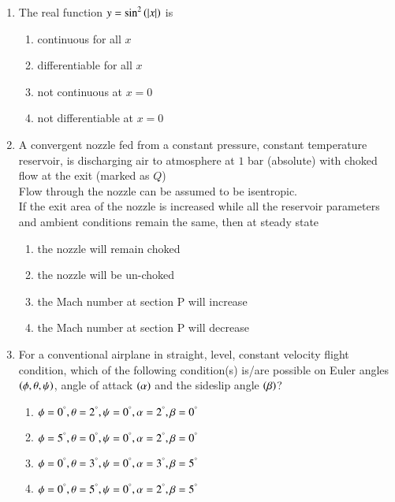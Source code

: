 \documentclass[journal]{IEEEtran}
\begin{document}
\begin{enumerate}
    \item The real function $y = \sin ^2 \left(\left\vert x\right\vert\right)$ is
        \begin{enumerate}
            \item continuous for all $x$
            \item differentiable for all $x$
            \item not continuous at $x=0$
            \item not differentiable at $x=0$
        \end{enumerate}

    \item A convergent nozzle fed from a constant pressure, constant temperature reservoir, is discharging air to atmosphere at $1$ bar (absolute) with choked flow at the exit (marked as $Q$)\\Flow through the nozzle can be assumed to be isentropic.\\If the exit area of the nozzle is increased while all the reservoir parameters and ambient conditions remain the same, then at steady state
        \begin{figure}[H]
            \centering
            
            \caption{}
            \label{44fig}
        \end{figure}

        \begin{enumerate}
            \item the nozzle will remain choked
            \item the nozzle will be un-choked
            \item the Mach number at section P will increase
            \item the Mach number at section P will decrease
        \end{enumerate}

    \item For a conventional airplane in straight, level, constant velocity flight condition, which of the following condition(s) is/are possible on Euler angles $\left(\phi, \theta, \psi\right)$, angle of attack $\left(\alpha\right)$ and the sideslip angle $\left(\beta\right)$?
        \begin{enumerate}
            \item $\phi = 0^{\degree}, \theta = 2^{\degree}, \psi = 0^{\degree}, \alpha = 2^{\degree}, \beta = 0^{\degree}$
            \item $\phi = 5^{\degree}, \theta = 0^{\degree}, \psi = 0^{\degree}, \alpha = 2^{\degree}, \beta = 0^{\degree}$
            \item $\phi = 0^{\degree}, \theta = 3^{\degree}, \psi = 0^{\degree}, \alpha = 3^{\degree}, \beta = 5^{\degree}$
            \item $\phi = 0^{\degree}, \theta = 5^{\degree}, \psi = 0^{\degree}, \alpha = 2^{\degree}, \beta = 5^{\degree}$
        \end{enumerate}


\end{enumerate}
\end{document}
